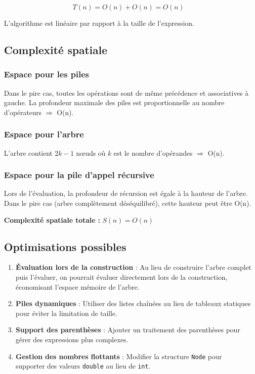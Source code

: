 \documentclass[12pt,a4paper]{article}
\begin{document}
$$\boxed{T(n) = O(n) + O(n) = O(n)}$$

L'algorithme est linéaire par rapport à la taille de l'expression.

\subsection{Complexité spatiale}

\subsubsection{Espace pour les piles}

Dans le pire cas, toutes les opérations sont de même précédence et associatives à gauche. La profondeur maximale des piles est proportionnelle au nombre d'opérateurs $\Rightarrow$ O(n).

\subsubsection{Espace pour l'arbre}

L'arbre contient $2k - 1$ nœuds où $k$ est le nombre d'opérandes $\Rightarrow$ O(n).

\subsubsection{Espace pour la pile d'appel récursive}

Lors de l'évaluation, la profondeur de récursion est égale à la hauteur de l'arbre. Dans le pire cas (arbre complètement déséquilibré), cette hauteur peut être O(n).

\textbf{Complexité spatiale totale :} $\boxed{S(n) = O(n)}$

\subsection{Optimisations possibles}

\begin{enumerate}
    \item \textbf{Évaluation lors de la construction} : Au lieu de construire l'arbre complet puis l'évaluer, on pourrait évaluer directement lors de la construction, économisant l'espace mémoire de l'arbre.
    \item \textbf{Piles dynamiques} : Utiliser des listes chaînées au lieu de tableaux statiques pour éviter la limitation de taille.
    \item \textbf{Support des parenthèses} : Ajouter un traitement des parenthèses pour gérer des expressions plus complexes.
    \item \textbf{Gestion des nombres flottants} : Modifier la structure \texttt{Node} pour supporter des valeurs \texttt{double} au lieu de \texttt{int}.
\end{enumerate}
\end{document}
